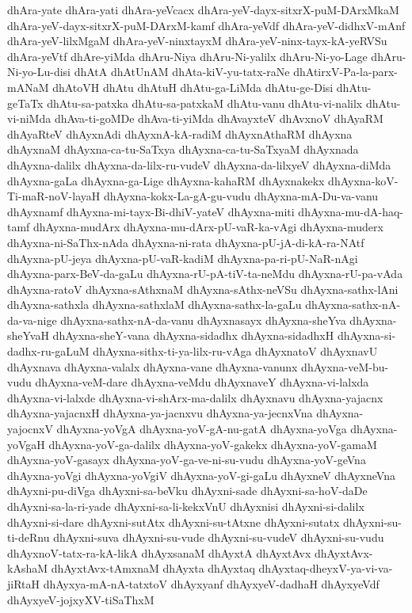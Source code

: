 {dhAra-yate
dhAra-yati
dhAra-yeVcacx
dhAra-yeV-dayx-sitxrX-puM-DArxMkaM
dhAra-yeV-dayx-sitxrX-puM-DArxM-kamf
dhAra-yeVdf
dhAra-yeV-didhxV-mAnf
dhAra-yeV-lilxMgaM
dhAra-yeV-ninxtayxM
dhAra-yeV-ninx-tayx-kA-yeRVSu
dhAra-yeVtf
dhAre-yiMda
dhAru-Niya
dhAru-Ni-yalilx
dhAru-Ni-yo-Lage
dhAru-Ni-yo-Lu-disi
dhAtA
dhAtUnAM
dhAta-kiV-yu-tatx-raNe
dhAtirxV-Pa-la-parx-mANaM
dhAtoVH
dhAtu
dhAtuH
dhAtu-ga-LiMda
dhAtu-ge-Disi
dhAtu-geTaTx
dhAtu-sa-patxka
dhAtu-sa-patxkaM
dhAtu-vanu
dhAtu-vi-nalilx
dhAtu-vi-niMda
dhAva-ti-goMDe
dhAva-ti-yiMda
dhAvayxteV
dhAvxnoV
dhAyaRM
dhAyaRteV
dhAyxnAdi
dhAyxnA-kA-radiM
dhAyxnAthaRM
dhAyxna
dhAyxnaM
dhAyxna-ca-tu-SaTxya
dhAyxna-ca-tu-SaTxyaM
dhAyxnada
dhAyxna-dalilx
dhAyxna-da-lilx-ru-vudeV
dhAyxna-da-lilxyeV
dhAyxna-diMda
dhAyxna-gaLa
dhAyxna-ga-Lige
dhAyxna-kahaRM
dhAyxnakekx
dhAyxna-koV-Ti-maR-noV-layaH
dhAyxna-kokx-La-gA-gu-vudu
dhAyxna-mA-Du-va-vanu
dhAyxnamf
dhAyxna-mi-tayx-Bi-dhiV-yateV
dhAyxna-miti
dhAyxna-mu-dA-haq-tamf
dhAyxna-mudArx
dhAyxna-mu-dArx-pU-vaR-ka-vAgi
dhAyxna-muderx
dhAyxna-ni-SaThx-nAda
dhAyxna-ni-rata
dhAyxna-pU-jA-di-kA-ra-NAtf
dhAyxna-pU-jeya
dhAyxna-pU-vaR-kadiM
dhAyxna-pa-ri-pU-NaR-nAgi
dhAyxna-parx-BeV-da-gaLu
dhAyxna-rU-pA-tiV-ta-neMdu
dhAyxna-rU-pa-vAda
dhAyxna-ratoV
dhAyxna-sAthxnaM
dhAyxna-sAthx-neVSu
dhAyxna-sathx-lAni
dhAyxna-sathxla
dhAyxna-sathxlaM
dhAyxna-sathx-la-gaLu
dhAyxna-sathx-nA-da-va-nige
dhAyxna-sathx-nA-da-vanu
dhAyxnasayx
dhAyxna-sheYva
dhAyxna-sheYvaH
dhAyxna-sheY-vana
dhAyxna-sidadhx
dhAyxna-sidadhxH
dhAyxna-si-dadhx-ru-gaLuM
dhAyxna-sithx-ti-ya-lilx-ru-vAga
dhAyxnatoV
dhAyxnavU
dhAyxnava
dhAyxna-valalx
dhAyxna-vane
dhAyxna-vanunx
dhAyxna-veM-bu-vudu
dhAyxna-veM-dare
dhAyxna-veMdu
dhAyxnaveY
dhAyxna-vi-lalxda
dhAyxna-vi-lalxde
dhAyxna-vi-shArx-ma-dalilx
dhAyxnavu
dhAyxna-yajacnx
dhAyxna-yajacnxH
dhAyxna-ya-jacnxvu
dhAyxna-ya-jecnxVna
dhAyxna-yajocnxV
dhAyxna-yoVgA
dhAyxna-yoV-gA-nu-gatA
dhAyxna-yoVga
dhAyxna-yoVgaH
dhAyxna-yoV-ga-dalilx
dhAyxna-yoV-gakekx
dhAyxna-yoV-gamaM
dhAyxna-yoV-gasayx
dhAyxna-yoV-ga-ve-ni-su-vudu
dhAyxna-yoV-geVna
dhAyxna-yoVgi
dhAyxna-yoVgiV
dhAyxna-yoV-gi-gaLu
dhAyxneV
dhAyxneVna
dhAyxni-pu-diVga
dhAyxni-sa-beVku
dhAyxni-sade
dhAyxni-sa-hoV-daDe
dhAyxni-sa-la-ri-yade
dhAyxni-sa-li-kekxVnU
dhAyxnisi
dhAyxni-si-dalilx
dhAyxni-si-dare
dhAyxni-sutAtx
dhAyxni-su-tAtxne
dhAyxni-sutatx
dhAyxni-su-ti-deRnu
dhAyxni-suva
dhAyxni-su-vude
dhAyxni-su-vudeV
dhAyxni-su-vudu
dhAyxnoV-tatx-ra-kA-likA
dhAyxsanaM
dhAyxtA
dhAyxtAvx
dhAyxtAvx-kAshaM
dhAyxtAvx-tAmxnaM
dhAyxta
dhAyxtaq
dhAyxtaq-dheyxV-ya-vi-va-jiRtaH
dhAyxya-mA-nA-tatxtoV
dhAyxyanf
dhAyxyeV-dadhaH
dhAyxyeVdf
dhAyxyeV-jojxyXV-tiSaThxM
}
